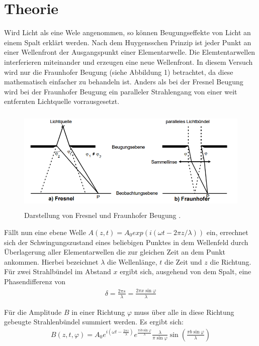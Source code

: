 \section{Theorie}
\label{sec:Theorie}

Wird Licht als eine Wele angenommen, so können Beugungseffekte von Licht an einem Spalt erklärt werden. Nach dem Huygensschen
Prinzip ist jeder Punkt an einer Wellenfront der Ausgangspunkt einer Elementarwelle. Die Elemtentarwellen interferieren miteinander
und erzeugen eine neue Wellenfront. In diesem Versuch wird nur die Fraunhofer Beugung (siehe Abbildung 1) betrachtet, da diese
mathematisch einfacher zu behandeln ist. Anders als bei der Fresnel Beugung wird bei der Fraunhofer Beugung ein
paralleler Strahlengang von einer weit entfernten Lichtquelle vorrausgesetzt.


\begin{figure}[H]
  \centering
  \includegraphics[height=5cm]{fraunhofer.PNG}
  \caption{Darstellung von Fresnel und Fraunhofer Beugung \cite{sample}.}
  \label{fig:biegungbild1}
\end{figure}

Fällt nun eine ebene Welle $A(z, t) = A_0 exp(i(\omega t -2\pi z/\lambda))$ ein, errechnet sich der Schwingungszustand  eines
beliebigen Punktes in dem Wellenfeld durch Überlagerung aller Elementarwellen die zur gleichen Zeit an dem Punkt ankommen. Hierbei bezeichnet
$\lambda$ die Wellenlänge, $t$ die Zeit und $z$ die Richtung.
Für zwei Strahlbündel im Abstand $x$ ergibt sich, ausgehend von dem Spalt, eine Phasendifferenz von
\begin{align}
  \delta = \frac{2\pi s}{\lambda} = \frac{2\pi x \sin{\varphi}}{\lambda}
\end{align}

Für die Amplitude $B$ in einer Richtung $\varphi$ muss über alle in diese Richtung gebeugte Strahlenbündel summiert werden. Es ergibt sich:
\begin{align}
  B(z,t, \varphi) = A_0 e^{i \left(\omega t - \frac{2\pi z}{\lambda} \right)} e^{\frac{\pi i b \sin{\varphi}}{\lambda}} \frac{\lambda}{\pi \sin{\varphi}}
  \sin{\left(\frac{\pi b \sin{\varphi}}{\lambda}\right)}
\end{align}

